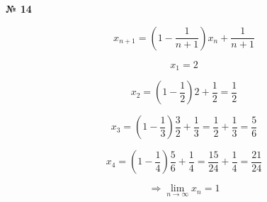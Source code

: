 \documentclass{article}
\begin{document}
\textbf{№ 14} 

\Large

$$ x_{n+1} = \left(1-\frac{1}{n+1}\right)x_n+\frac{1}{n+1} $$

$$ x_{1} = 2 $$

$$ x_{2} = \left(1-\frac{1}{2}\right)2+\frac{1}{2} 
= \frac{1}{2} $$

$$ x_{3} = \left(1-\frac{1}{3}\right)\frac{3}{2}+\frac{1}{3} 
= \frac{1}{2} + \frac{1}{3} 
= \frac{5}{6} $$

$$ x_{4} = \left(1-\frac{1}{4}\right)\frac{5}{6}+\frac{1}{4} 
= \frac{15}{24} + \frac{1}{4} 
= \frac{21}{24}
$$

$$ \Rightarrow \lim_{n\to\infty} x_n = 1 $$
\end{document}
